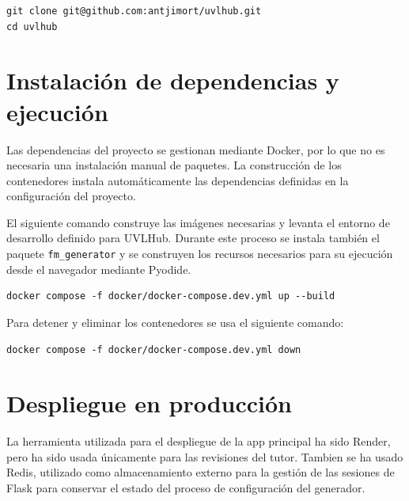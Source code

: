 \begin{verbatim}
git clone git@github.com:antjimort/uvlhub.git
cd uvlhub
\end{verbatim}

\section{Instalación de dependencias y ejecución}
\label{sec:instalacion_dependencias}


Las dependencias del proyecto se gestionan mediante Docker, por lo que no es
necesaria una instalación manual de paquetes. La construcción de los
contenedores instala automáticamente las dependencias definidas en la
configuración del proyecto.

El siguiente comando construye las imágenes necesarias y levanta el entorno de
desarrollo definido para UVLHub. Durante este proceso se instala también el
paquete \texttt{fm\_generator} y se construyen los recursos necesarios para su
ejecución desde el navegador mediante Pyodide.

\begin{verbatim}
docker compose -f docker/docker-compose.dev.yml up --build
\end{verbatim}

Para detener y eliminar los contenedores se usa el siguiente comando:

\begin{verbatim}
docker compose -f docker/docker-compose.dev.yml down
\end{verbatim}

\section{Despliegue en producción}
\label{sec:despliegue_produccion}


La herramienta utilizada para el despliegue de la app principal ha sido Render, pero ha sido usada únicamente para las revisiones del tutor. Tambien se ha usado Redis, utilizado como almacenamiento externo para la gestión de las
sesiones de Flask para conservar el estado
del proceso de configuración del generador.

